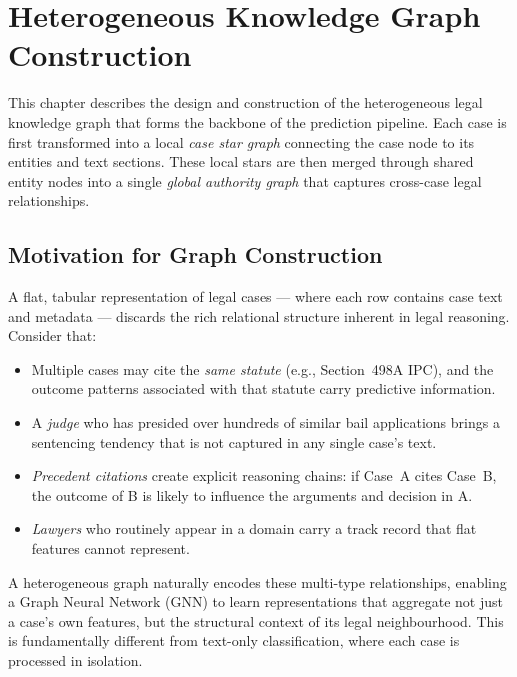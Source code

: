 \chapter{Heterogeneous Knowledge Graph Construction}
\label{ch:graph}

This chapter describes the design and construction of the heterogeneous legal knowledge graph that forms the backbone of the prediction pipeline. Each case is first transformed into a local \emph{case star graph} connecting the case node to its entities and text sections. These local stars are then merged through shared entity nodes into a single \emph{global authority graph} that captures cross-case legal relationships.

\section{Motivation for Graph Construction}
\label{sec:graph-motivation}

A flat, tabular representation of legal cases — where each row contains case text and metadata — discards the rich relational structure inherent in legal reasoning. Consider that:

\begin{itemize}
    \item Multiple cases may cite the \emph{same statute} (e.g., Section~498A IPC), and the outcome patterns associated with that statute carry predictive information.
    \item A \emph{judge} who has presided over hundreds of similar bail applications brings a sentencing tendency that is not captured in any single case's text.
    \item \emph{Precedent citations} create explicit reasoning chains: if Case~A cites Case~B, the outcome of B is likely to influence the arguments and decision in A.
    \item \emph{Lawyers} who routinely appear in a domain carry a track record that flat features cannot represent.
\end{itemize}

A heterogeneous graph naturally encodes these multi-type relationships, enabling a Graph Neural Network (GNN) to learn representations that aggregate not just a case's own features, but the structural context of its legal neighbourhood. This is fundamentally different from text-only classification, where each case is processed in isolation.

